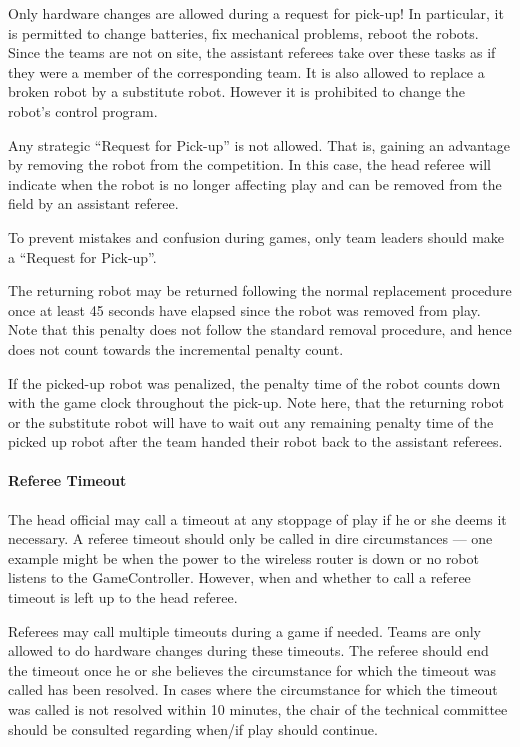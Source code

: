 Only hardware changes are allowed during a request for pick-up! In particular, it is permitted to change batteries, fix mechanical problems, reboot the robots. Since the teams are not on site, the assistant referees take over these tasks as if they were a member of the corresponding team.
It is also allowed to replace a broken robot by a substitute robot.
However it is prohibited to change the robot's control program.

Any strategic ``Request for Pick-up'' is not allowed.
That is, gaining an advantage by removing the robot from the competition.
In this case, the head referee will indicate when the robot is no longer affecting play and can be removed from the field by an assistant referee.

To prevent mistakes and confusion during games, only team leaders should make a ``Request for Pick-up''.

The returning robot may be returned following the normal replacement procedure once at least 45 seconds have elapsed since the robot was removed from play. Note that this penalty does not follow the standard removal procedure, and hence does not count towards the incremental penalty count.

If the picked-up robot was penalized, the penalty time of the robot counts down with the game clock throughout the pick-up.
Note here, that the returning robot or the substitute robot will have to wait out any remaining penalty time of the picked up robot after the team handed their robot back to the assistant referees.

\paragraph{Referee Timeout}
\label{sec:referee_timeout}
The head official may call a timeout at any stoppage of play if he or she deems it necessary. A referee timeout should only be called in dire circumstances --- one example might be when the power to the wireless router is down or no robot listens to the GameController. However, when and whether to call a referee timeout is left up to the head referee.

Referees may call multiple timeouts during a game if needed. Teams are only allowed to do hardware changes during these timeouts.  The referee should end the timeout once he or she believes the circumstance for which the timeout was called has been resolved.  In cases where the circumstance for which the timeout was called is not resolved within 10 minutes, the chair of the technical committee should be consulted regarding when/if play should continue.

